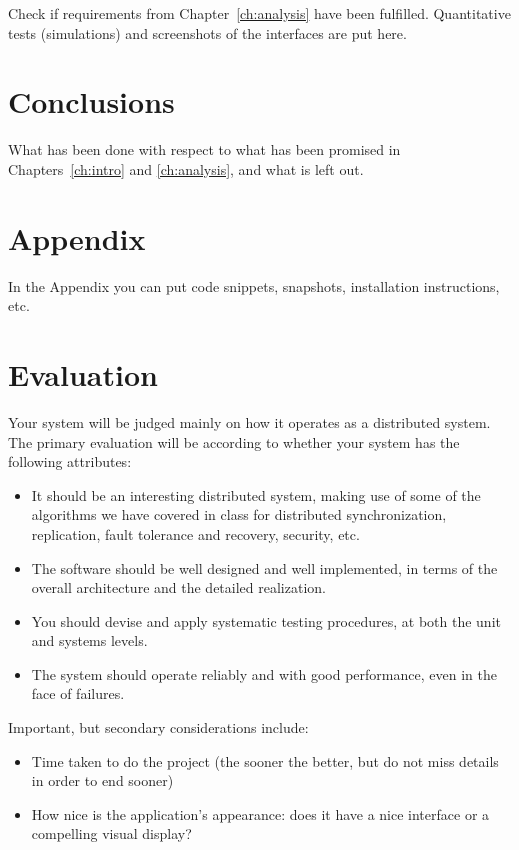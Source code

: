 \documentclass{memoir}
\begin{document}
Check if requirements from Chapter~\ref{ch:analysis} have been fulfilled.
Quantitative tests (simulations) and screenshots of the interfaces are put here.


\chapter{Conclusions}

What has been done with respect to what has been promised in Chapters~\ref{ch:intro} and \ref{ch:analysis}, and what is left out.

\appendix

\chapter{Appendix}

In the Appendix you can put code snippets, snapshots, installation instructions, etc.


\chapter*{Evaluation}
Your system will be judged mainly on how it operates as a distributed system. The primary evaluation will be according to whether your system has the following attributes:
\begin{itemize}
\item  It should be an interesting distributed system, making use of some of the algorithms we have covered in class for distributed synchronization, replication, fault tolerance and recovery, security, etc.
\item The software should be well designed and well implemented, in terms of the overall architecture and the detailed realization.
\item You should devise and apply systematic testing procedures, at both the unit and systems levels.
\item The system should operate reliably and with good performance, even in the face of failures.
\end{itemize}
Important, but secondary considerations include:
\begin{itemize}
\item Time taken to do the project (the sooner the better, but do not miss details in order to end sooner)
\item  How nice is the application's appearance: does it have a nice interface or a compelling visual display?
\end{itemize}
\end{document}
